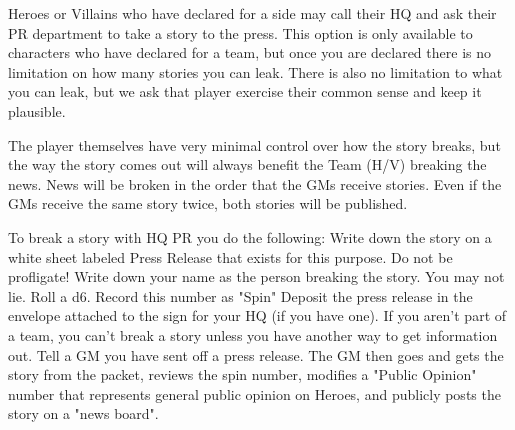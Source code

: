 \documentclass[green]{LRSguildcamp1}
\begin{document}
Heroes or Villains who have declared for a side may call their HQ and ask their PR department to take a story to the press. This option is only available to characters who have declared for a team, but once you are declared there is no limitation on how many stories you can leak. There is also no limitation to what you can leak, but we ask that player exercise their common sense and keep it plausible. 

The player themselves have very minimal control over how the story breaks, but the way the story comes out will always benefit the Team (H/V) breaking the news. News will be broken in the order that the GMs receive stories. Even if the GMs receive the same story twice, both stories will be published. 

To break a story with HQ PR you do the following:
Write down the story on a white sheet labeled Press Release that exists for this purpose. Do not be profligate! 
Write down your name as the person breaking the story. You may not lie. 
Roll a d6. Record this number as "Spin"
Deposit the press release in the envelope attached to the sign for your HQ (if you have one). If you aren't part of a team, you can't break a story unless you have another way to get information out. Tell a GM you have sent off a press release.
The GM then goes and gets the story from the packet, reviews the spin number, modifies a "Public Opinion" number that represents general public opinion on Heroes, and publicly posts the story on a "news board". 
\end{document}
